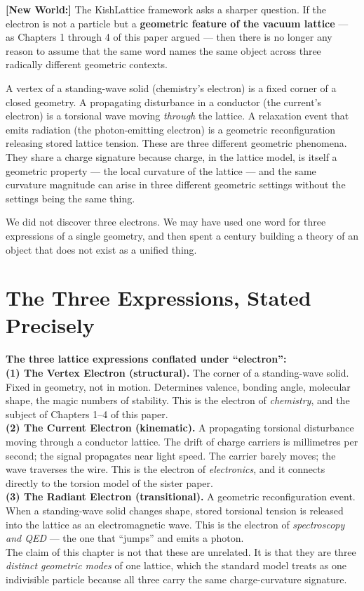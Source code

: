 \documentclass[11pt, letterpaper, openany]{book}
\newcommand{\newworldcmd}[1]{\noindent\textbf{\color{kishblue}[New World:]}
  #1\medskip}
\begin{document}
\newworldcmd{The KishLattice framework asks a sharper question. If the
electron is not a particle but a \textbf{geometric feature of the vacuum
lattice} --- as Chapters 1 through 4 of this paper argued --- then there
is no longer any reason to assume that the same word names the same object
across three radically different geometric contexts.
 
A vertex of a standing-wave solid (chemistry's electron) is a fixed corner
of a closed geometry. A propagating disturbance in a conductor (the
current's electron) is a torsional wave moving \emph{through} the lattice.
A relaxation event that emits radiation (the photon-emitting electron) is
a geometric reconfiguration releasing stored lattice tension. These are
three different geometric phenomena. They share a charge signature because
charge, in the lattice model, is itself a geometric property --- the local
curvature of the lattice --- and the same curvature magnitude can arise in
three different geometric settings without the settings being the same
thing.
 
We did not discover three electrons. We may have used one word for three
expressions of a single geometry, and then spent a century building a
theory of an object that does not exist as a unified thing.}
 
\section{The Three Expressions, Stated Precisely}
 
\begin{theorybox}
\textbf{The three lattice expressions conflated under ``electron'':}\\[0.5em]
\textbf{(1) The Vertex Electron (structural).} The corner of a standing-wave
solid. Fixed in geometry, not in motion. Determines valence, bonding angle,
molecular shape, the magic numbers of stability. This is the electron of
\emph{chemistry}, and the subject of Chapters 1--4 of this paper.\\[0.5em]
\textbf{(2) The Current Electron (kinematic).} A propagating torsional
disturbance moving through a conductor lattice. The drift of charge
carriers is millimetres per second; the signal propagates near light
speed. The carrier barely moves; the wave traverses the wire. This is the
electron of \emph{electronics}, and it connects directly to the torsion
model of the sister paper.\\[0.5em]
\textbf{(3) The Radiant Electron (transitional).} A geometric
reconfiguration event. When a standing-wave solid changes shape, stored
torsional tension is released into the lattice as an electromagnetic wave.
This is the electron of \emph{spectroscopy and QED} --- the one that
``jumps'' and emits a photon.\\[0.5em]
The claim of this chapter is not that these are unrelated. It is that they
are three \emph{distinct geometric modes} of one lattice, which the
standard model treats as one indivisible particle because all three carry
the same charge-curvature signature.
\end{theorybox}
 
\end{document}
